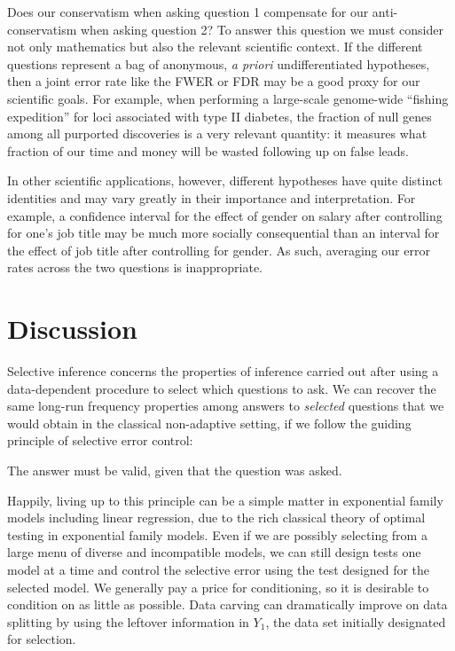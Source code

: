 \documentclass{article}
\theoremstyle{definition}
\newcommand{\sampOrData}{data }
\newcommand{\capSampOrData}{Data }
\begin{document}
Does our conservatism when asking question 1 compensate for our anti-conservatism when asking question 2? To answer this question we must consider not only mathematics but also the relevant scientific context. If the different questions represent a bag of anonymous, {\em a priori} undifferentiated hypotheses, then a joint error rate like the FWER or FDR may be a good proxy for our scientific goals. For example, when performing a large-scale genome-wide ``fishing expedition'' for loci associated with type II diabetes, the fraction of null genes among all purported discoveries is a very relevant quantity: it measures what fraction of our time and money will be wasted following up on false leads.

In other scientific applications, however, different hypotheses have quite distinct identities and may vary greatly in their importance and interpretation. For example, a confidence interval for the effect of gender on salary after controlling for one's job title may be much more socially consequential than an interval for the effect of job title after controlling for gender. As such, averaging our error rates
across the two questions is inappropriate.


\section{Discussion}\label{sec:discussion}

Selective inference concerns the properties of inference carried out after using a data-dependent procedure to select which questions to ask. We can recover the same long-run frequency properties among answers to {\em selected} questions that we would obtain in the classical non-adaptive setting, if we follow the guiding principle of selective error control:
\begin{center}
The answer must be valid, given that the question was asked.
\end{center}

Happily, living up to this principle can be a simple matter in exponential family models including linear regression, due to the rich classical theory of optimal testing in exponential family models. Even if we are possibly selecting from a large menu of diverse and incompatible models, we can still design tests one model at a time and control the selective error using the test designed for the selected model. We generally pay a price for conditioning, so it is desirable to condition on as little as possible. \capSampOrData carving can dramatically improve on \sampOrData splitting by using the leftover information in $Y_{1}$, the data set initially designated for selection.
\end{document}
